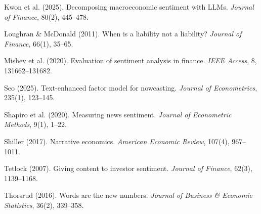 \documentclass[11pt]{article}
\begin{document}
Kwon et al. (2025). Decomposing macroeconomic sentiment with LLMs. \textit{Journal of Finance}, 80(2), 445--478.

Loughran \& McDonald (2011). When is a liability not a liability? \textit{Journal of Finance}, 66(1), 35--65.

Mishev et al. (2020). Evaluation of sentiment analysis in finance. \textit{IEEE Access}, 8, 131662--131682.

Seo (2025). Text-enhanced factor model for nowcasting. \textit{Journal of Econometrics}, 235(1), 123--145.

Shapiro et al. (2020). Measuring news sentiment. \textit{Journal of Econometric Methods}, 9(1), 1--22.

Shiller (2017). Narrative economics. \textit{American Economic Review}, 107(4), 967--1011.

Tetlock (2007). Giving content to investor sentiment. \textit{Journal of Finance}, 62(3), 1139--1168.

Thorsrud (2016). Words are the new numbers. \textit{Journal of Business \& Economic Statistics}, 36(2), 339--358.
\end{document}
